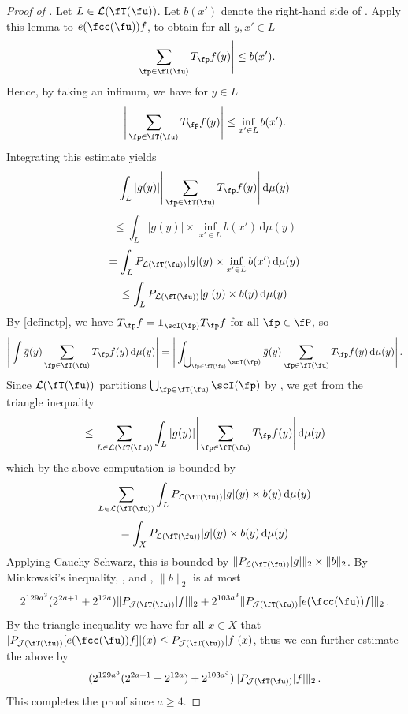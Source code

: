 \begin{proof}[Proof of ]
    \leanok
    Let $L \in \mathcal{L}(\fT(\fu))$.
    Let $b(x')$ denote the right-hand side of . Apply this lemma to $e(\fcc(\fu)) f$, to obtain for all $y, x' \in L$
    $$
        \Bigg| \sum_{\fp \in \fT(\fu)} T_{\fp} f(y) \Bigg| \le b(x').
    $$
    Hence, by taking an infimum, we have for $y \in L$
    $$
        \Bigg| \sum_{\fp \in \fT(\fu)} T_{\fp} f(y) \Bigg| \le \inf_{x' \in L} b(x').
    $$
    Integrating this estimate yields
    $$
        \int_L |g(y)| \Bigg| \sum_{\fp \in \fT(\fu)} T_{\fp} f(y) \Bigg| \, \mathrm{d}\mu(y)
    $$
    $$
        \le \int_L |g(y)| \times \inf_{x' \in L} b(x') \, \mathrm{d}\mu(y)
    $$
    $$
        =   \int_L P_{\mathcal{L}(\fT(\fu))}|g|(y) \times \inf_{x' \in L} b(x') \, \mathrm{d}\mu(y)
    $$
    $$
        \le \int_L P_{\mathcal{L}(\fT(\fu))}|g|(y) \times  b(y) \, \mathrm{d}\mu(y)
    $$
    By \eqref{definetp}, we have $T_{\fp} f = \mathbf{1}_{\scI(\fp)} T_{\fp} f$ for all $\fp \in \fP$, so
    $$
        \Bigg| \int \bar g(y) \sum_{\fp \in \fT(\fu)} T_{\fp} f(y) \, \mathrm{d}\mu(y) \Bigg| = \Bigg| \int_{\bigcup_{\fp \in \fT(\fu)} \scI(\fp)} \bar g(y) \sum_{\fp \in \fT(\fu)} T_{\fp} f(y) \, \mathrm{d}\mu(y) \Bigg|\,.
    $$
    Since $\mathcal{L}(\fT(\fu))$ partitions $\bigcup_{\fp \in \fT(\fu)} \scI(\fp)$ by ,
    we get from the triangle inequality
    $$
        \le \sum_{L \in \mathcal{L}(\fT(\fu))} \int_L |g(y)| \Bigg| \sum_{\fp \in \fT(\fu)} T_{\fp} f(y) \Bigg| \, \mathrm{d}\mu(y)
    $$
    which by the above computation is bounded by
    $$
        \sum_{L \in \mathcal{L}(\fT(\fu))} \int_L P_{\mathcal{L}(\fT(\fu))}|g|(y) \times  b(y) \, \mathrm{d}\mu(y)
    $$
    $$
        = \int_X P_{\mathcal{L}(\fT(\fu))}|g|(y) \times  b(y) \, \mathrm{d}\mu(y)
    $$
    Applying Cauchy-Schwarz, this is bounded by $\|P_{\mathcal{L}(\fT(\fu))}|g|\|_2 \times \|b\|_2$.
    By Minkowski's inequality, ,  and , $\|b\|_2$ is at most
    $$
        2^{129a^3} (2^{2a+1} + 2^{12a})\|P_{\mathcal{J}(\fT(\fu))}|f|\|_2 + 2^{103a^3} \|P_{\mathcal{J}(\fT(\fu))}[e(\fcc(\fu))f]\|_2\,.
    $$
    By the triangle inequality we have for all $x \in X$ that $|P_{\mathcal{J}(\fT(\fu))}[e(\fcc(\fu))f]|(x) \le P_{\mathcal{J}(\fT(\fu))}|f|(x)$, thus we can further estimate the above by
    $$
        (2^{129a^3} (2^{2a+1} + 2^{12a}) + 2^{103a^3}) \|P_{\mathcal{J}(\fT(\fu))}|f|\|_2\,.
    $$
    This completes the proof since $a \ge 4$.
\end{proof}

